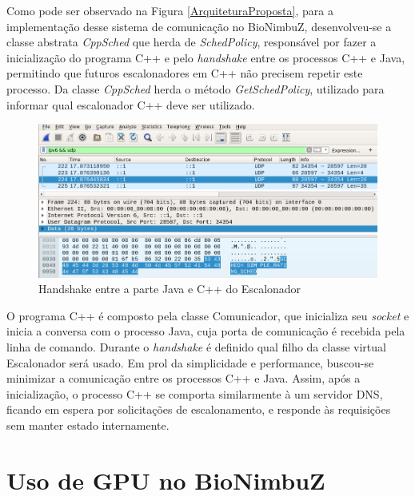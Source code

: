 

Como pode ser observado na Figura \ref{ArquiteturaProposta}, para a implementação desse sistema de comunicação no BioNimbuZ, desenvolveu-se a classe abstrata \textit{CppSched} que herda de \textit{SchedPolicy}, responsável por fazer a inicialização do programa C++ e pelo \textit{handshake} entre os processos C++ e Java, permitindo que futuros escalonadores em C++ não precisem repetir este processo. Da classe \textit{CppSched} herda o método \textit{GetSchedPolicy}, utilizado para informar qual escalonador C++ deve ser utilizado.

\begin{figure}[htbp]
	\centerline{\includegraphics[width=13cm]{img/Handshake3.png}}
	\caption{Handshake entre a parte Java e C++ do Escalonador}
	\label{Handshake}
\end{figure}

O programa C++ é composto pela classe Comunicador, que inicializa seu \textit{socket} e inicia a conversa com o processo Java, cuja porta de comunicação é recebida pela linha de comando. Durante o \textit{handshake} é definido qual filho da classe virtual Escalonador será usado. Em prol da simplicidade e performance, buscou-se minimizar a comunicação entre os processos C++ e Java. Assim, após a inicialização, o processo C++ se comporta similarmente à um servidor \acrshort{DNS}\cite{dns_rfc}, ficando em espera por solicitações de escalonamento, e responde às requisições sem manter estado internamente.

\section{Uso de \acrshort{GPU} no BioNimbuZ}

